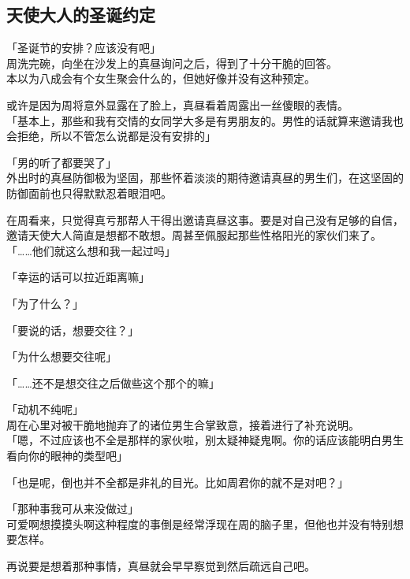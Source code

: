 \subsection{天使大人的圣诞约定}

「圣诞节的安排？应该没有吧」\\

周洗完碗，向坐在沙发上的真昼询问之后，得到了十分干脆的回答。\\

本以为八成会有个女生聚会什么的，但她好像并没有这种预定。

或许是因为周将意外显露在了脸上，真昼看着周露出一丝傻眼的表情。\\

「基本上，那些和我有交情的女同学大多是有男朋友的。男性的话就算来邀请我也会拒绝，所以不管怎么说都是没有安排的」

「男的听了都要哭了」\\

外出时的真昼防御极为坚固，那些怀着淡淡的期待邀请真昼的男生们，在这坚固的防御面前也只得默默忍着眼泪吧。

在周看来，只觉得真亏那帮人干得出邀请真昼这事。要是对自己没有足够的自信，邀请天使大人简直是想都不敢想。周甚至佩服起那些性格阳光的家伙们来了。\\

「……他们就这么想和我一起过吗」

「幸运的话可以拉近距离嘛」

「为了什么？」

「要说的话，想要交往？」

「为什么想要交往呢」

「……还不是想交往之后做些这个那个的嘛」

「动机不纯呢」\\

周在心里对被干脆地抛弃了的诸位男生合掌致意，接着进行了补充说明。\\

「嗯，不过应该也不全是那样的家伙啦，别太疑神疑鬼啊。你的话应该能明白男生看向你的眼神的类型吧」

「也是呢，倒也并不全都是非礼的目光。比如周君你的就不是对吧？」

「那种事我可从来没做过」\\

可爱啊想摸摸头啊这种程度的事倒是经常浮现在周的脑子里，但他也并没有特别想要怎样。

再说要是想着那种事情，真昼就会早早察觉到然后疏远自己吧。\\

